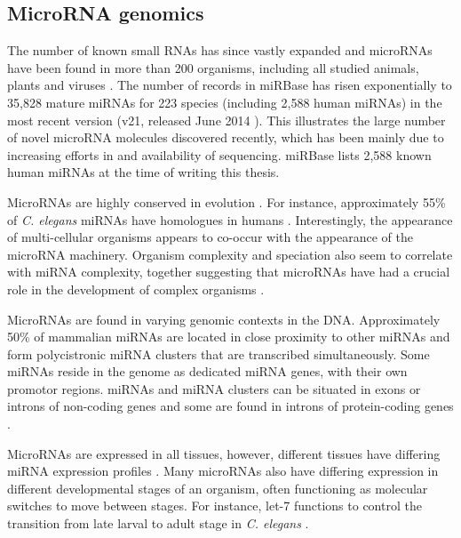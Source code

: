 \subsection{MicroRNA genomics}\label{microrna-genomics}

The number of known small RNAs has since vastly expanded and microRNAs have
been found in more than 200 organisms, including all studied animals, plants
\citep{JonesRhoades2006} and viruses \citep{Grundhoff2011}. The number of
records in miRBase has risen exponentially
to 35,828 mature miRNAs for 223 species (including 2,588 human miRNAs) in the
most recent version (v21, released June 2014 \citep{MiRBaseWeb}). This
illustrates the large number of novel microRNA molecules discovered recently,
which has been mainly due to increasing efforts in and availability of
sequencing. miRBase lists 2,588 known human miRNAs at the time of writing this
thesis.

MicroRNAs are highly conserved in evolution \citep{Bartel2004}. For instance,
approximately 55\% of \emph{C. elegans} miRNAs have homologues in humans
\citep{IbanezVentoso2008}. Interestingly, the
appearance of multi-cellular organisms appears to co-occur with the appearance
of the microRNA machinery. Organism complexity and speciation also seem to
correlate with miRNA complexity, together suggesting that microRNAs have had a
crucial role in the development of complex organisms \citep{Lee2007}.

MicroRNAs are found in varying genomic contexts in the DNA. Approximately 50\% of
mammalian miRNAs are located in close proximity to other miRNAs and form
polycistronic miRNA clusters that are transcribed simultaneously. Some miRNAs
reside in the genome as dedicated miRNA genes, with their own promotor regions.
\citep{Kim2009} miRNAs and miRNA clusters can be situated in exons or
introns of non-coding genes and some are found in introns of protein-coding genes
\citep{Du2005}.

MicroRNAs are expressed in all tissues, however, different tissues have
differing miRNA expression profiles \citep{Krol2010}. Many microRNAs also have
differing expression in different developmental stages of an organism, often
functioning as molecular switches to move between stages. For instance,
let-7 functions to control the transition from late larval to adult stage in
\emph{C. elegans} \citep{Bartel2004}.

